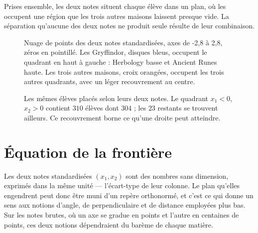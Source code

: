 Prises ensemble, les deux notes situent chaque élève dans un plan, où les \Gryf
occupent une région que les trois autres maisons laissent presque vide. La
séparation qu'aucune des deux notes ne produit seule résulte de leur
combinaison.

\begin{figure}[htbp]
\centering
\begin{graphique}{Nuage de points des deux notes standardisées, axes de -2,8 à 2,8, zéros en pointillé. Les Gryffindor, disques bleus, occupent le quadrant en haut à gauche : Herbology basse et Ancient Runes haute. Les trois autres maisons, croix orangées, occupent les trois autres quadrants, avec un léger recouvrement au centre.}
\end{graphique}
\caption{Les mêmes élèves placés selon leurs deux notes. Le quadrant $x_1<0$,
$x_2>0$ contient $310$ élèves dont $304$ \Gryf ; les $23$ \Gryf restants se
trouvent ailleurs. Ce recouvrement borne ce qu'une droite peut atteindre.}
\label{fig:nuage}
\end{figure}
\FloatBarrier

\section{Équation de la frontière}

Les deux notes standardisées $(x_1,x_2)$ sont des nombres sans dimension,
exprimés dans la même unité --- l'écart-type de leur colonne. Le plan qu'elles
engendrent peut donc être muni d'un repère orthonormé, et c'est ce qui donne un
sens aux notions d'angle, de perpendiculaire et de distance employées plus bas.
Sur les notes brutes, où un axe se gradue en points et l'autre en centaines de
points, ces deux notions dépendraient du barème de chaque matière.

